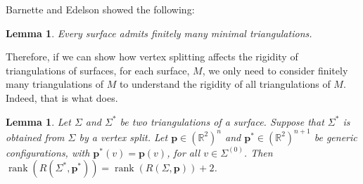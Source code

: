 \documentclass[11pt]{amsart}
\newtheorem{lemma}[theorem]{Lemma}
\theoremstyle{definition}
\theoremstyle{remark}
\DeclareMathOperator{\rank}{rank}
\begin{document}
Barnette and Edelson showed the following:

\begin{lemma}\cite{barnette1989all}
    Every surface admits finitely many minimal triangulations. 
\end{lemma}

Therefore, if we can show how vertex splitting affects the rigidity of triangulations of surfaces, for each surface, $M$, we only need to consider finitely many triangulations of $M$ to understand the rigidity of all triangulations of $M$.
Indeed, that is what  does.

\begin{lemma}\label{lem:vsrig}
    Let $\Sigma$ and $\Sigma^*$ be two triangulations of a surface.
    Suppose that $\Sigma^*$ is obtained from $\Sigma$ by a vertex split.
    Let $\mathbf{p}\in(\mathbb{R}^2)^n$ and $\mathbf{p}^*\in(\mathbb{R}^2)^{n+1}$ be generic configurations, with $\mathbf{p}^*(v)=\mathbf{p}(v)$, for all $v\in\Sigma^{(0)}$.
    Then $\rank(R(\Sigma^*,\mathbf{p}^*))=\rank(R(\Sigma,\mathbf{p}))+2$.
\end{lemma}
\end{document}
